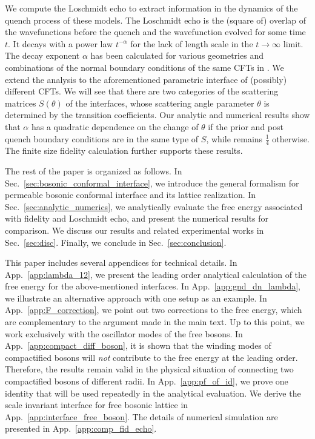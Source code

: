 We compute the Loschmidt echo to extract information in the dynamics of the quench process of these models. The Loschmidt echo is the (square of) overlap of the wavefunctions before the quench and the wavefunction evolved for some time $t$. It decays with a power law $t^{- \alpha}$ for the lack of length scale in the $t \rightarrow \infty$ limit. The decay exponent $\alpha$ has been calculated for various geometries and combinations of the normal boundary conditions of the same CFTs in . We extend the analysis to the aforementioned parametric interface of (possibly) different CFTs. We will see that there are two categories of the scattering matrices $S(\theta)$ of the interfaces, whose scattering angle parameter $\theta$ is determined by the transition coefficients. Our analytic and numerical results show that $\alpha$ has a quadratic dependence on the change of $\theta$ if the prior and post quench boundary conditions are in the same type of $S$, while remains $\frac{1}{4}$ otherwise. The finite size fidelity calculation further supports these results. 

The rest of the paper is organized as follows. In Sec.~\ref{sec:bosonic_conformal_interface}, we introduce the general formalism for permeable bosonic conformal interface and its lattice realization. In Sec.~\ref{sec:analytic_numerics}, we analytically evaluate the free energy associated with fidelity and Loschmidt echo, and present the numerical results for comparison. We discuss our results and related experimental works in Sec.~\ref{sec:disc}. Finally, we conclude in Sec.~\ref{sec:conclusion}. 

This paper includes several appendices for technical details. In App.~\ref{app:lambda_12}, we present the leading order analytical calculation of the free energy for the above-mentioned interfaces. In App.~\ref{app:gnd_dn_lambda}, we illustrate an alternative approach with one setup as an example. In App.~\ref{app:F_correction}, we point out two corrections to the free energy, which are complementary to the argument made in the main text. Up to this point, we work exclusively with the oscillator modes of the free bosons. In App.~\ref{app:compact_diff_boson}, it is shown that the winding modes of compactified bosons will \emph{not} contribute to the free energy at the leading order. Therefore, the results remain valid in the physical situation of connecting two compactified bosons of different radii. In App.~\ref{app:pf_of_id}, we prove one identity that will be used repeatedly in the analytical evaluation. We derive the scale invariant interface for free bosonic lattice in App.~\ref{app:interface_free_boson}. The details of numerical simulation are presented in App.~\ref{app:comp_fid_echo}.  

